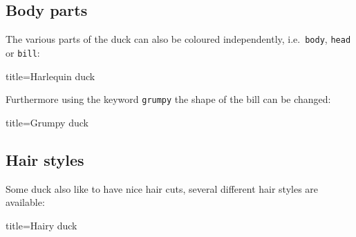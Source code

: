 \documentclass[parskip=half]{scrartcl}
\begin{document}
\subsection{Body parts}

The various parts of the duck can also be coloured independently, i.e.\ \lstinline|body|, \lstinline|head| or \lstinline|bill|:

\begin{tcblisting}{title={Harlequin duck}}
\begin{tikzpicture}
	\duck[body=yellow,
		head=yellow!50!orange, 
		bill=red,
		eye=green]
\end{tikzpicture}
\end{tcblisting}

Furthermore using the keyword \lstinline|grumpy| the shape of the bill can be changed:

\begin{tcblisting}{title={Grumpy duck}}
\begin{tikzpicture}
	\duck[grumpy]
\end{tikzpicture}
\begin{tikzpicture}
	\duck[grumpy, bill=cyan]
\end{tikzpicture}
\end{tcblisting}

\clearpage
\subsection{Hair styles}

Some duck also like to have nice hair cuts, several different hair styles are available:
\begin{tcblisting}{title={Hairy duck}}
\begin{tikzpicture}
	\duck[longhair]
\end{tikzpicture}
\begin{tikzpicture}
	\duck[shorthair]
\end{tikzpicture}

\begin{tikzpicture}
	\duck[crazyhair]
\end{tikzpicture}
\begin{tikzpicture}
	\duck[recedinghair]
\end{tikzpicture}

\begin{tikzpicture}
	\duck[mohican]
\end{tikzpicture}
\begin{tikzpicture}
	\duck[mullet]
\end{tikzpicture}
\end{tcblisting}
\end{document}
